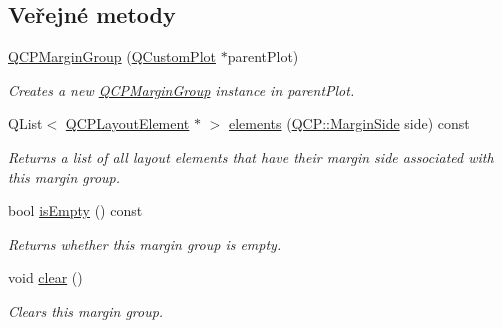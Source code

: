 \subsection*{Veřejné metody}
\begin{DoxyCompactItemize}
\item 
\hypertarget{classQCPMarginGroup_ac481c20678ec5b305d6df330715f4b7b}{}\hyperlink{classQCPMarginGroup_ac481c20678ec5b305d6df330715f4b7b}{Q\+C\+P\+Margin\+Group} (\hyperlink{classQCustomPlot}{Q\+Custom\+Plot} $\ast$parent\+Plot)\label{classQCPMarginGroup_ac481c20678ec5b305d6df330715f4b7b}

\begin{DoxyCompactList}\small\item\em Creates a new \hyperlink{classQCPMarginGroup}{Q\+C\+P\+Margin\+Group} instance in {\itshape parent\+Plot}. \end{DoxyCompactList}\item 
\hypertarget{classQCPMarginGroup_a2f39e319c9ece34e0392c2ca350f1069}{}Q\+List$<$ \hyperlink{classQCPLayoutElement}{Q\+C\+P\+Layout\+Element} $\ast$ $>$ \hyperlink{classQCPMarginGroup_a2f39e319c9ece34e0392c2ca350f1069}{elements} (\hyperlink{namespaceQCP_a7e487e3e2ccb62ab7771065bab7cae54}{Q\+C\+P\+::\+Margin\+Side} side) const \label{classQCPMarginGroup_a2f39e319c9ece34e0392c2ca350f1069}

\begin{DoxyCompactList}\small\item\em Returns a list of all layout elements that have their margin {\itshape side} associated with this margin group. \end{DoxyCompactList}\item 
bool \hyperlink{classQCPMarginGroup_a28c8e87a0b87c01bd28c693faabddd7b}{is\+Empty} () const 
\begin{DoxyCompactList}\small\item\em Returns whether this margin group is empty. \end{DoxyCompactList}\item 
void \hyperlink{classQCPMarginGroup_a144b67f216e4e86c3a3a309e850285fe}{clear} ()
\begin{DoxyCompactList}\small\item\em Clears this margin group. \end{DoxyCompactList}\end{DoxyCompactItemize}

